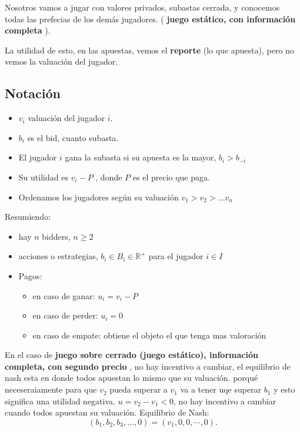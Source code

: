 Nosotros vamos a jugar con valores privados, subastas cerrada, y conocemos todas las prefecias de los demás jugadores. ( \textbf{juego estático, con información completa} ).

La utilidad de esto, en las apuestas, vemos el \textbf{reporte} (lo que apuesta), pero no vemos  la valuación del jugador.


\subsection{ Notación } 
\begin{itemize}
	\item $v_i$ valuación del jugador  $i$.
	\item  $b_i$ es el bid, cuanto subasta.
	\item  El jugador $i$  gana la subasta si su apuesta es la mayor, $b_i> b_{-i}$ 
	\item  Su utilidad es $v_i - P$ , donde $P$ es el precio que paga.
	\item   Ordenamos los jugadores según su valuación  $v_1> v_2 > \ldots v_n$
\end{itemize}

Resumiendo:

\begin{itemize}
	\item hay $n$ bidders,  $n\ge 2$
	\item  acciones o estrategias, $ b_i \in B_i \in \mathbb{R}^{+}$ para el jugador $i \in I$ 
	\item  Pagos:  
		\begin{itemize}
			\item  en caso de ganar: $u_i = v_i - P$
			\item  en caso de perder: $u_i = 0$ 
			\item  en caso de empate: obtiene el objeto el que tenga mas valoración 
		\end{itemize}	
\end{itemize}

En el caso de \textbf{ juego sobre cerrado (juego estático), información completa, con segundo precio} , no hay incentivo a cambiar, el equilibrio de nash esta en donde todos apuestan
lo mismo que su valuación. porqué neceseraiamente para que $v_2$ pueda superar a  $v_1$ va a tener uqe superar  $b_1$ y esto significa una utilidad 
negativa. $u = v_2 - v_1 < 0$, no hay incentivo a cambiar cuando todos apuestan su valuación. {\color{red}Equilibrio de Nash: }  
\[
	(b_1, b_2, b_3, \ldots, 0)	=  (v_1, 0, 0, \cdots, 0)
.\] 

